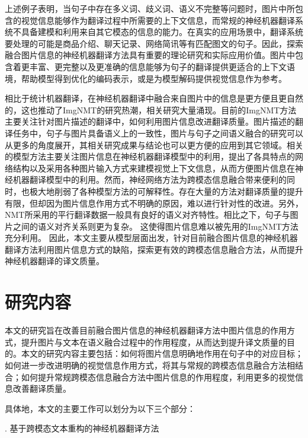 上述例子表明，当句子中存在多义词、歧义词、语义不完整等问题时，图片中所包含的视觉信息能够作为翻译过程中所需要的上下文信息，而常规的神经机器翻译系统不具备建模和利用来自其它模态的信息的能力。在真实的应用场景中，翻译系统要处理的可能是商品介绍、聊天记录、网络简讯等有匹配图文的句子。因此，探索融合图片信息的神经机器翻译方法具有重要的理论研究和实际应用价值。图片中包含着更丰富、更完整以及更准确的信息能够为句子的翻译提供更适合的上下文语境，帮助模型得到优化的编码表示，或是为模型解码提供视觉信息作为参考。

相比于统计机器翻译，在神经机器翻译中融合来自图片中的信息是更方便且更自然的，这也推动了ImgNMT的研究热潮，相关研究大量涌现。目前的ImgNMT方法主要关注针对图片描述的翻译中，如何利用图片信息改进翻译质量。图片描述的翻译任务中，句子与图片具备语义上的一致性，图片与句子之间语义融合的研究可以从更多的角度展开，其相关研究成果与结论也可以更方便的应用到其它领域。相关的模型方法主要关注图片信息在神经机器翻译模型中的利用，提出了各具特点的网络结构以及采用各种图片输入方式来建模视觉上下文信息，从而方便图片信息在神经机器翻译模型中的利用。然而，神经网络方法为跨模态信息融合带来便利的同时，也极大地削弱了各种模型方法的可解释性。存在大量的方法对翻译质量的提升有限，但却因为图片信息作用方式不明确的原因，难以进行针对性的改进。另外，NMT所采用的平行翻译数据一般具有良好的语义对齐特性。相比之下，句子与图片之间的语义对齐关系则更为复杂。
这使得图片信息难以被先用的ImgNMT方法充分利用。%
因此，本文主要从模型层面出发，针对目前融合图片信息的神经机器翻译方法利用图片信息方式的缺陷，探索更有效的跨模态信息融合方法，从而提升神经机器翻译的译文质量。


\section{研究内容}

本文的研究旨在改善目前融合图片信息的神经机器翻译方法中图片信息的作用方式，提升图片与文本在语义融合过程中的作用程度，从而达到提升译文质量的目的。本文的研究内容主要包括：如何将图片信息明确地作用在句子中的对应目标；如何进一步改进明确的视觉信息作用方式，将其与常规的跨模态信息融合方法相结合；如何提升常规跨模态信息融合方法中图片信息的作用程度，利用更多的视觉信息改善翻译质量。

具体地，本文的主要工作可以划分为以下三个部分：

{. 基于跨模态文本重构的神经机器翻译方法}

